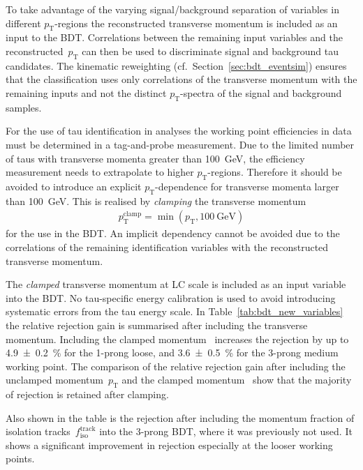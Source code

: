 To take advantage of the varying signal/background separation of variables in
different $p_\text{T}$-regions the reconstructed transverse momentum is included
as an input to the BDT. Correlations between the remaining input variables and
the reconstructed~$p_\text{T}$ can then be used to discriminate signal and
background tau candidates. The kinematic reweighting (cf.\
Section~\ref{sec:bdt_eventsim}) ensures that the classification uses only
correlations of the transverse momentum with the remaining inputs and not the
distinct $p_\text{T}$-spectra of the signal and background samples.

For the use of tau identification in analyses the working point efficiencies in
data must be determined in a tag-and-probe measurement. Due to the limited
number of taus with transverse momenta greater than \SI{100}{\GeV}, the
efficiency measurement needs to extrapolate to higher $p_\text{T}$-regions.
Therefore it should be avoided to introduce an explicit $p_\text{T}$-dependence
for transverse momenta larger than \SI{100}{\GeV}. This is realised by
\emph{clamping} the transverse momentum
\begin{align*}
  p_\text{T}^\text{clamp} = \min(p_\text{T}, \SI{100}{\giga\electronvolt})
\end{align*}
for the use in the BDT. An implicit dependency cannot be avoided due to the
correlations of the remaining identification variables with the reconstructed
transverse momentum.

The \emph{clamped} transverse momentum at LC scale is included as an input
variable into the BDT. No tau-specific energy calibration is used to avoid
introducing systematic errors from the tau energy scale. In
Table~\ref{tab:bdt_new_variables} the relative rejection gain is summarised
after including the transverse momentum. Including the clamped
momentum~ increases the rejection by up to
\SI{4.9 +- 0.2}{\percent} for the 1-prong loose, and \SI{3.6 +- 0.5}{\percent}
for the 3-prong medium working point. The comparison of the relative rejection
gain after including the unclamped momentum~$p_\text{T}$ and the clamped
momentum~\smash{$p_\text{T}^\text{clamp}$} show that the majority of rejection
is retained after clamping.

Also shown in the table is the rejection after including the momentum fraction
of isolation tracks~$f_\text{iso}^\text{track}$ into the 3-prong BDT, where it
was previously not used. It shows a significant improvement in rejection
especially at the looser working points.

